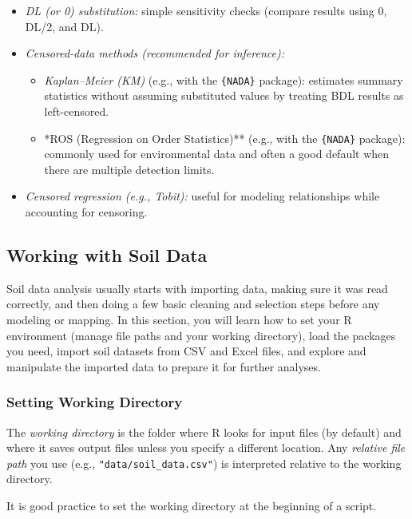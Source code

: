 \documentclass[
  10pt,
  b5paper,
  oneside]{book}
\providecommand{\tightlist}{%
  \setlength{\itemsep}{0pt}\setlength{\parskip}{0pt}}
\begin{document}
\begin{itemize}
\item
  \emph{DL (or 0) substitution:} simple sensitivity checks (compare results using 0, DL/2, and DL).
\item
  \emph{Censored-data methods (recommended for inference):}

  \begin{itemize}
  \tightlist
  \item
    \emph{Kaplan--Meier (KM)} (e.g., with the \texttt{\{NADA\}} package): estimates summary statistics without assuming substituted values by treating BDL results as left-censored.
  \item
    *ROS (Regression on Order Statistics)** (e.g., with the \texttt{\{NADA\}} package): commonly used for environmental data and often a good default when there are multiple detection limits.
  \end{itemize}
\item
  \emph{Censored regression (e.g., Tobit):} useful for modeling relationships while accounting for censoring.
\end{itemize}

\subsection{Working with Soil Data}\label{soil-data}

Soil data analysis usually starts with importing data, making sure it was read correctly, and then doing a few basic cleaning and selection steps before any modeling or mapping. In this section, you will learn how to set your R environment (manage file paths and your working directory), load the packages you need, import soil datasets from CSV and Excel files, and explore and manipulate the imported data to prepare it for further analyses.

\subsubsection{Setting Working Directory}\label{set-directory}

The \emph{working directory} is the folder where R looks for input files (by default) and where it saves output files unless you specify a different location. Any \emph{relative file path} you use (e.g., \texttt{"data/soil\_data.csv"}) is interpreted relative to the working directory.

It is good practice to set the working directory at the beginning of a script.
\end{document}
